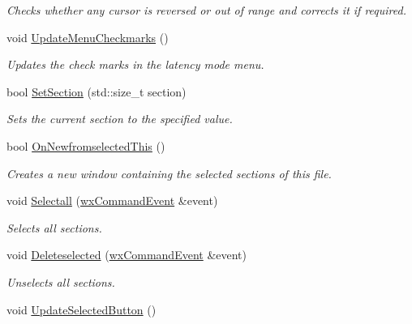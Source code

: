 \begin{DoxyCompactItemize}
\begin{DoxyCompactList}\small\item\em Checks whether any cursor is reversed or out of range and corrects it if required. \item\end{DoxyCompactList}\item 
\hypertarget{classwxStfDoc_aa2ec0e9a57dfa2d3d0debb8045eb6d4c}{
void \hyperlink{classwxStfDoc_aa2ec0e9a57dfa2d3d0debb8045eb6d4c}{UpdateMenuCheckmarks} ()}
\label{classwxStfDoc_aa2ec0e9a57dfa2d3d0debb8045eb6d4c}

\begin{DoxyCompactList}\small\item\em Updates the check marks in the latency mode menu. \item\end{DoxyCompactList}\item 
bool \hyperlink{classwxStfDoc_ab4a211cde4a5861c29fbdb550598abb5}{SetSection} (std::size\_\-t section)
\begin{DoxyCompactList}\small\item\em Sets the current section to the specified value. \item\end{DoxyCompactList}\item 
bool \hyperlink{classwxStfDoc_a3ef8caec9a376d179e6eadae7ff25aa3}{OnNewfromselectedThis} ()
\begin{DoxyCompactList}\small\item\em Creates a new window containing the selected sections of this file. \item\end{DoxyCompactList}\item 
void \hyperlink{classwxStfDoc_a42949b9f9cbc3f4859df05c900f74a68}{Selectall} (\hyperlink{classwxCommandEvent}{wxCommandEvent} \&event)
\begin{DoxyCompactList}\small\item\em Selects all sections. \item\end{DoxyCompactList}\item 
void \hyperlink{classwxStfDoc_ae5d2d78952dab927680a42588a75418f}{Deleteselected} (\hyperlink{classwxCommandEvent}{wxCommandEvent} \&event)
\begin{DoxyCompactList}\small\item\em Unselects all sections. \item\end{DoxyCompactList}\item 
\hypertarget{classwxStfDoc_ab1fb4e6a7c9e727e2f6051552e595c8c}{
void \hyperlink{classwxStfDoc_ab1fb4e6a7c9e727e2f6051552e595c8c}{UpdateSelectedButton} ()}
\label{classwxStfDoc_ab1fb4e6a7c9e727e2f6051552e595c8c}


\end{DoxyCompactItemize}
